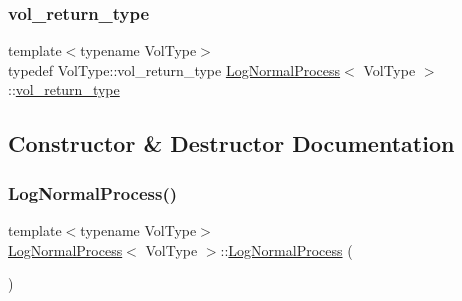 \subsubsection{\texorpdfstring{vol\+\_\+return\+\_\+type}{vol\_return\_type}}
{\footnotesize\ttfamily template$<$typename Vol\+Type$>$ \\
typedef Vol\+Type\+::vol\+\_\+return\+\_\+type \hyperlink{class_log_normal_process}{Log\+Normal\+Process}$<$ Vol\+Type $>$\+::\hyperlink{class_log_normal_process_a160d9cd152962a42ac9fc016d0948c1c}{vol\+\_\+return\+\_\+type}}



\subsection{Constructor \& Destructor Documentation}
\hypertarget{class_log_normal_process_acf4b8a29784c43d8c613d9707492179c}{}\label{class_log_normal_process_acf4b8a29784c43d8c613d9707492179c} 
\subsubsection{\texorpdfstring{Log\+Normal\+Process()}{LogNormalProcess()}\hspace{0.1cm}{\footnotesize\ttfamily [1/2]}}
{\footnotesize\ttfamily template$<$typename Vol\+Type$>$ \\
\hyperlink{class_log_normal_process}{Log\+Normal\+Process}$<$ Vol\+Type $>$\+::\hyperlink{class_log_normal_process}{Log\+Normal\+Process} (\begin{DoxyParamCaption}{ }\end{DoxyParamCaption})\hspace{0.3cm}{\ttfamily [default]}}

\hypertarget{class_log_normal_process_a1320686151d44d334be1289d21f1c711}{}\label{class_log_normal_process_a1320686151d44d334be1289d21f1c711} 
